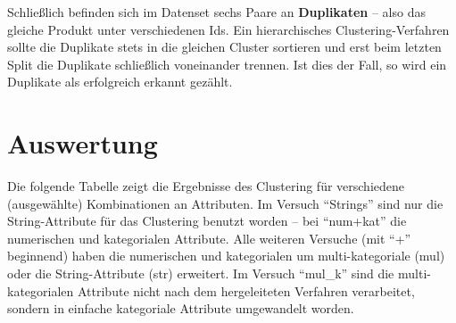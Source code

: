 Schließlich befinden sich im Datenset sechs Paare an \textbf{Duplikaten}
-- also das gleiche Produkt unter verschiedenen Ids. Ein hierarchisches
Clustering-Verfahren sollte die Duplikate stets in die gleichen Cluster
sortieren und erst beim letzten Split die Duplikate schließlich
voneinander trennen. Ist dies der Fall, so wird ein Duplikate als
erfolgreich erkannt gezählt.

\hypertarget{auswertung}{%
\section{Auswertung}\label{auswertung}}

Die folgende Tabelle zeigt die Ergebnisse des Clustering für
verschiedene (ausgewählte) Kombinationen an Attributen. Im Versuch
``Strings'' sind nur die String-Attribute für das Clustering benutzt
worden -- bei ``num+kat'' die numerischen und kategorialen Attribute.
Alle weiteren Versuche (mit ``+'' beginnend) haben die numerischen und
kategorialen um multi-kategoriale (mul) oder die String-Attribute (str)
erweitert. Im Versuch ``mul\_k'' sind die multi-kategorialen Attribute
nicht nach dem hergeleiteten Verfahren verarbeitet, sondern in einfache
kategoriale Attribute umgewandelt worden.

